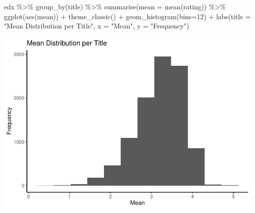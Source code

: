 \documentclass[
]{article}
\newenvironment{Shaded}{}{}
\newcommand{\AttributeTok}[1]{\textcolor[rgb]{0.49,0.56,0.16}{#1}}
\newcommand{\DecValTok}[1]{\textcolor[rgb]{0.25,0.63,0.44}{#1}}
\newcommand{\FunctionTok}[1]{\textcolor[rgb]{0.02,0.16,0.49}{#1}}
\newcommand{\NormalTok}[1]{#1}
\newcommand{\SpecialCharTok}[1]{\textcolor[rgb]{0.25,0.44,0.63}{#1}}
\newcommand{\StringTok}[1]{\textcolor[rgb]{0.25,0.44,0.63}{#1}}
\begin{document}
\begin{Shaded}
\begin{Highlighting}[]
\NormalTok{edx }\SpecialCharTok{\%\textgreater{}\%}
   \FunctionTok{group\_by}\NormalTok{(title) }\SpecialCharTok{\%\textgreater{}\%}
   \FunctionTok{summarise}\NormalTok{(}\AttributeTok{mean =} \FunctionTok{mean}\NormalTok{(rating)) }\SpecialCharTok{\%\textgreater{}\%}
   \FunctionTok{ggplot}\NormalTok{(}\FunctionTok{aes}\NormalTok{(mean)) }\SpecialCharTok{+}
   \FunctionTok{theme\_classic}\NormalTok{()  }\SpecialCharTok{+}
   \FunctionTok{geom\_histogram}\NormalTok{(}\AttributeTok{bins=}\DecValTok{12}\NormalTok{) }\SpecialCharTok{+}
   \FunctionTok{labs}\NormalTok{(}\AttributeTok{title =} \StringTok{"Mean Distribution per Title"}\NormalTok{,}
        \AttributeTok{x =} \StringTok{"Mean"}\NormalTok{,}
        \AttributeTok{y =} \StringTok{"Frequency"}\NormalTok{)}
\end{Highlighting}
\end{Shaded}

\begin{center}\includegraphics{MovieLens-Project-Code_files/figure-latex/unnamed-chunk-25-1} \end{center}
\end{document}
